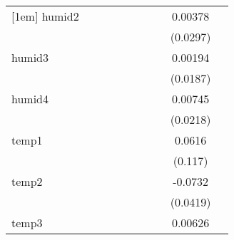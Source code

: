 {\begin{tabular}{l*{9}{c}}
[1em]
humid2      &                     &                     &                     &                     &                     &                     &                     &     0.00378         &                     \\
            &                     &                     &                     &                     &                     &                     &                     &    (0.0297)         &                     \\
[1em]
humid3      &                     &                     &                     &                     &                     &                     &                     &     0.00194         &                     \\
            &                     &                     &                     &                     &                     &                     &                     &    (0.0187)         &                     \\
[1em]
humid4      &                     &                     &                     &                     &                     &                     &                     &     0.00745         &                     \\
            &                     &                     &                     &                     &                     &                     &                     &    (0.0218)         &                     \\
[1em]
temp1       &                     &                     &                     &                     &                     &                     &                     &      0.0616         &                     \\
            &                     &                     &                     &                     &                     &                     &                     &     (0.117)         &                     \\
[1em]
temp2       &                     &                     &                     &                     &                     &                     &                     &     -0.0732         &                     \\
            &                     &                     &                     &                     &                     &                     &                     &    (0.0419)         &                     \\
[1em]
temp3       &                     &                     &                     &                     &                     &                     &                     &     0.00626         &                     \\

\end{tabular}}
